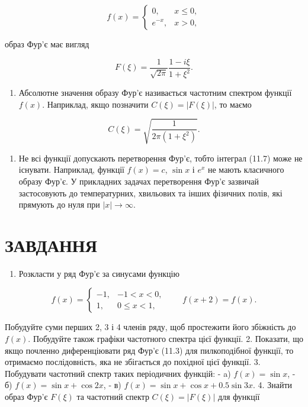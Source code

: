 \documentclass[
  ukrainian,
]{article}
\providecommand{\tightlist}{%
  \setlength{\itemsep}{0pt}\setlength{\parskip}{0pt}}
\begin{document}
\[
f(x)=
\begin{cases}
0, & x \le 0,\\
e^{-x}, & x > 0,
\end{cases}
\]

образ Фур'є має вигляд

\[
F(\xi) = \frac{1}{\sqrt{2\pi}} \frac{1-i\xi}{1+\xi^2}.
\]

\begin{enumerate}
\def\labelenumi{\arabic{enumi}.}
\setcounter{enumi}{1}
\tightlist
\item
  Абсолютне значення образу Фур'є називається частотним спектром функції
  \(f(x)\). Наприклад, якщо позначити \(C(\xi)=|F(\xi)|\), то маємо
\end{enumerate}

\[
C(\xi) = \sqrt{\frac{1}{2\pi(1+\xi^2)}}.
\]

\begin{enumerate}
\def\labelenumi{\arabic{enumi}.}
\setcounter{enumi}{2}
\tightlist
\item
  Не всі функції допускають перетворення Фур'є, тобто інтеграл (11.7)
  може не існувати. Наприклад, функції \(f(x)=c\), \(\sin x\) і \(e^x\)
  не мають класичного образу Фур'є. У прикладних задачах перетворення
  Фур'є зазвичай застосовують до температурних, хвильових та інших
  фізичних полів, які прямують до нуля при \(|x|\to\infty\).
\end{enumerate}

\section{ЗАВДАННЯ}\label{ux437ux430ux432ux434ux430ux43dux43dux44f-2}

\begin{enumerate}
\def\labelenumi{\arabic{enumi}.}
\tightlist
\item
  Розкласти у ряд Фур'є за синусами функцію
\end{enumerate}

\[
f(x)=
\begin{cases}
-1, & -1 < x < 0,\\
1, & 0 \le x < 1,
\end{cases}
\qquad f(x+2)=f(x).
\]

Побудуйте суми перших 2, 3 і 4 членів ряду, щоб простежити його
збіжність до \(f(x)\). Побудуйте також графіки частотного спектра цієї
функції. 2. Показати, що якщо почленно диференціювати ряд Фур'є (11.3)
для пилкоподібної функції, то отримаємо послідовність, яка не збігається
до похідної цієї функції. 3. Побудувати частотний спектр таких
періодичних функцій: - a) \(f(x)=\sin x\), - б) \(f(x)=\sin x+\cos 2x\),
- в) \(f(x)=\sin x+\cos x+0.5\sin 3x\). 4. Знайти образ Фур'є \(F(\xi)\)
та частотний спектр \(C(\xi)=|F(\xi)|\) для функції
\end{document}
